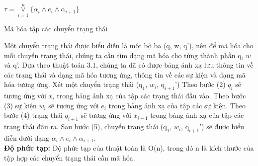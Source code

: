 \documentclass[a4paper,13pt,oneside,openany]{book}
\newenvironment{megaalgorithm}[1][htb]
{\renewcommand{\algorithmcfname}{Thuật toán}%
	\begin{algorithm}[#1]%
}{\end{algorithm}}
\begin{document}
\begin{flushleft}
\begin{megaalgorithm}[H]
			\Return $\tau = \overset{n}{\underset{i=1}{\lor}} \{\alpha_i \land e_i \land \alpha_{i+1}\}$
				
			\caption{Mã hóa tập các chuyển trạng thái}
		\end{megaalgorithm}
		
		Một chuyển trạng thái được biểu diễn là một bộ ba (q, w, q'), nên để mã hóa cho mỗi chuyển trạng thái, chúng ta cần tìm dạng mã hóa cho từng thành phần q, $w$ và q'. Dựa theo thuật toán 3.1, chúng ta đã có được bảng ánh xạ lưu thông tin về các trạng thái và dạng mã hóa tương ứng, thông tin về các sự kiện và dạng mã hóa tương ứng. Xét một chuyển trạng thái ($\textrm{q}_1$, $w_i$, $\textrm{q}_{i+1}$') Theo bước (2) $q_{i}$ sẽ tương ứng với $x_i$ trong bảng ánh xạ của tập các trạng thái đầu vào. Theo bước (3) sự kiện $w_i$ sẽ tương ứng với $e_i$ trong bảng ánh xạ của tập các sự kiện. Theo bước (4) trạng thái $q_{i+1}$ sẽ tương ứng với $x_{i+1}$ trong bảng ánh xạ của tập các trạng thái đầu ra. Sau bước (5), chuyển trạng thái ($\textrm{q}_1$, $w_i$, $\textrm{q}_{i+1}$') sẽ được biểu diễn dưới dạng $\alpha_{i} \land e_i \land \alpha_{i+1}$.\\
		\textbf{Độ phức tạp:} Độ phức tạp của thuật toán là O(n), trong đó n là kích thước của tập hợp các chuyển trạng thái cần mã hóa.

\end{flushleft}
\end{document}
